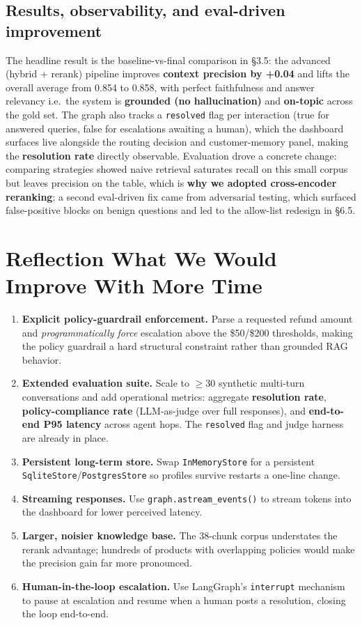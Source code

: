 \documentclass[11pt,a4paper]{article}
\newcommand{\code}[1]{\texttt{#1}}
\begin{document}
\subsection{Results, observability, and eval-driven improvement}
The headline result is the baseline-vs-final comparison in \S3.5: the advanced (hybrid + rerank)
pipeline improves \textbf{context precision by +0.04} and lifts the overall average from 0.854 to
0.858, with perfect faithfulness and answer relevancy \textemdash{} i.e.\ the system is
\textbf{grounded (no hallucination)} and \textbf{on-topic} across the gold set. The graph also
tracks a \code{resolved} flag per interaction (true for answered queries, false for escalations
awaiting a human), which the dashboard surfaces live alongside the routing decision and
customer-memory panel, making the \textbf{resolution rate} directly observable. Evaluation drove a
concrete change: comparing strategies showed naive retrieval saturates recall on this small corpus
but leaves precision on the table, which is \textbf{why we adopted cross-encoder reranking}; a
second eval-driven fix came from adversarial testing, which surfaced false-positive blocks on benign
questions and led to the allow-list redesign in \S6.5.

\section{Reflection \textemdash{} What We Would Improve With More Time}

\begin{enumerate}[leftmargin=1.3em,itemsep=2pt]
\item \textbf{Explicit policy-guardrail enforcement.} Parse a requested refund amount and
\emph{programmatically force} escalation above the \$50/\$200 thresholds, making the policy guardrail
a hard structural constraint rather than grounded RAG behavior.
\item \textbf{Extended evaluation suite.} Scale to $\geq$30 synthetic multi-turn conversations and
add operational metrics: aggregate \textbf{resolution rate}, \textbf{policy-compliance rate}
(LLM-as-judge over full responses), and \textbf{end-to-end P95 latency} across agent hops. The
\code{resolved} flag and judge harness are already in place.
\item \textbf{Persistent long-term store.} Swap \code{InMemoryStore} for a persistent
\code{SqliteStore}/\code{PostgresStore} so profiles survive restarts \textemdash{} a one-line change.
\item \textbf{Streaming responses.} Use \code{graph.astream\_events()} to stream tokens into the
dashboard for lower perceived latency.
\item \textbf{Larger, noisier knowledge base.} The 38-chunk corpus understates the rerank advantage;
hundreds of products with overlapping policies would make the precision gain far more pronounced.
\item \textbf{Human-in-the-loop escalation.} Use LangGraph's \code{interrupt} mechanism to pause at
escalation and resume when a human posts a resolution, closing the loop end-to-end.
\end{enumerate}
\end{document}

